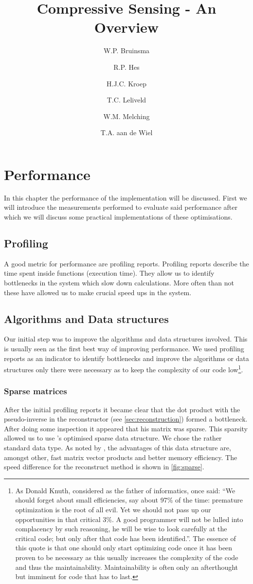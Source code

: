 \documentclass[a4paper, openany, oneside]{memoir}
\title{Compressive Sensing - An Overview}
\author{W.P. Bruinsma \and R.P. Hes \and H.J.C. Kroep \and T.C. Leliveld \and W.M. Melching \and T.A. aan de Wiel}
\begin{document}
\chapter{Performance}
\label{cha:performance}
In this chapter the performance of the implementation will be discussed. First we will introduce the measurements performed to evaluate said performance after which we will discuss some practical implementations of these optimisations.

\section{Profiling}
\label{sec:performance-profiling}
A good metric for performance are profiling reports. Profiling reports describe the time spent inside functions (execution time). They allow us to identify bottlenecks in the system which slow down calculations. More often than not these have allowed us to make crucial speed ups in the system.

\section{Algorithms and Data structures}
Our initial step was to improve the algorithms and data structures involved. This is usually seen as the first best way of improving performance. We used profiling reports as an indicator to identify bottlenecks and improve the algorithms or data structures only there were necessary as to keep the complexity of our code low\footnote{As Donald Knuth, considered as the father of informatics, once said: ``We should forget about small efficiencies, say about 97\% of the time: premature optimization is the root of all evil. Yet we should not pass up our opportunities in that critical 3\%. A good programmer will not be lulled into complacency by such reasoning, he will be wise to look carefully at the critical code; but only after that code has been identified.''\cite{knuth1974structured}. The essence of this quote is that one should only start optimizing code once it has been proven to be necessary as this usually increases the complexity of the code and thus the maintainability. Maintainability is often only an afterthought but imminent for code that has to last.}.

\subsection{Sparse matrices}
\label{sec:sparse-matrices}
After the initial profiling reports it became clear that the dot product with the pseudo-inverse in the reconstructor (see \cref{sec:reconstruction}) formed a bottleneck. After doing some inspection it appeared that his matrix was sparse. This sparsity allowed us to use 's optimised sparse data structure. We chose the rather standard  data type. As noted by \cite{numpyscipy}, the advantages of this data structure are, amongst other, fast matrix vector products and better memory efficiency. The speed difference for the reconstruct method is shown in \cref{fig:sparse}.
\end{document}
